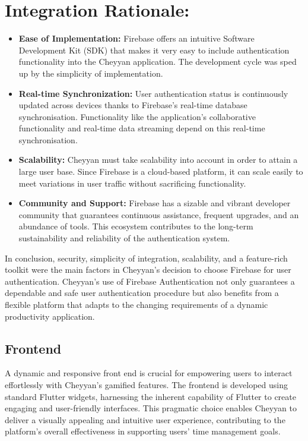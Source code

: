\documentclass{l4proj}
\begin{document}
\section*{Integration Rationale:}

\begin{itemize}
  \item \textbf{Ease of Implementation:} Firebase offers an intuitive Software Development Kit (SDK) that makes it very easy to include authentication functionality into the Cheyyan application. The development cycle was sped up by the simplicity of implementation.
  
  \item \textbf{Real-time Synchronization:} User authentication status is continuously updated across devices thanks to Firebase's real-time database synchronisation. Functionality like the application's collaborative functionality and real-time data streaming depend on this real-time synchronisation.

  \item \textbf{Scalability:} Cheyyan must take scalability into account in order to attain a large user base. Since Firebase is a cloud-based platform, it can scale easily to meet variations in user traffic without sacrificing functionality.

  \item \textbf{Community and Support:} Firebase has a sizable and vibrant developer community that guarantees continuous assistance, frequent upgrades, and an abundance of tools. This ecosystem contributes to the long-term sustainability and reliability of the authentication system.
\end{itemize}

In conclusion, security, simplicity of integration, scalability, and a feature-rich toolkit were the main factors in Cheyyan's decision to choose Firebase for user authentication. Cheyyan's use of Firebase Authentication not only guarantees a dependable and safe user authentication procedure but also benefits from a flexible platform that adapts to the changing requirements of a dynamic productivity application.



\subsection{Frontend}
A dynamic and responsive front end is crucial for empowering users to interact effortlessly with Cheyyan's gamified features. The frontend is developed using standard Flutter widgets, harnessing the inherent capability of Flutter to create engaging and user-friendly interfaces. This pragmatic choice enables Cheyyan to deliver a visually appealing and intuitive user experience, contributing to the platform's overall effectiveness in supporting users' time management goals.
\end{document}
